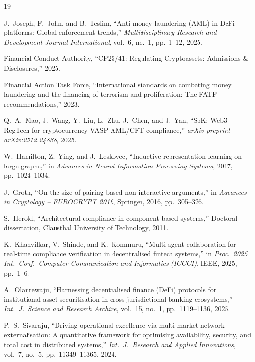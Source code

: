 \documentclass[journal]{IEEEtran}
\begin{document}
\begin{thebibliography}{19}

J.~Joseph, F.~John, and B.~Teslim, ``Anti-money laundering (AML) in DeFi platforms: Global enforcement trends,'' \textit{Multidisciplinary Research and Development Journal International}, vol.~6, no.~1, pp.~1--12, 2025.

Financial Conduct Authority, ``CP25/41: Regulating Cryptoassets: Admissions \& Disclosures,'' 2025.

Financial Action Task Force, ``International standards on combating money laundering and the financing of terrorism and proliferation: The FATF recommendations,'' 2023.

Q.~A.~Mao, J.~Wang, Y.~Liu, L.~Zhu, J.~Chen, and J.~Yan, ``SoK: Web3 RegTech for cryptocurrency VASP AML/CFT compliance,'' \textit{arXiv preprint arXiv:2512.24888}, 2025.

W.~Hamilton, Z.~Ying, and J.~Leskovec, ``Inductive representation learning on large graphs,'' in \textit{Advances in Neural Information Processing Systems}, 2017, pp.~1024--1034.

J.~Groth, ``On the size of pairing-based non-interactive arguments,'' in \textit{Advances in Cryptology -- EUROCRYPT 2016}, Springer, 2016, pp.~305--326.

S.~Herold, ``Architectural compliance in component-based systems,'' Doctoral dissertation, Clausthal University of Technology, 2011.

K.~Khanvilkar, V.~Shinde, and K.~Kommuru, ``Multi-agent collaboration for real-time compliance verification in decentralised fintech systems,'' in \textit{Proc.\ 2025 Int.\ Conf.\ Computer Communication and Informatics (ICCCI)}, IEEE, 2025, pp.~1--6.

A.~Olanrewaju, ``Harnessing decentralised finance (DeFi) protocols for institutional asset securitisation in cross-jurisdictional banking ecosystems,'' \textit{Int.\ J.\ Science and Research Archive}, vol.~15, no.~1, pp.~1119--1136, 2025.

P.~S.~Sivaraju, ``Driving operational excellence via multi-market network externalisation: A quantitative framework for optimising availability, security, and total cost in distributed systems,'' \textit{Int.\ J.\ Research and Applied Innovations}, vol.~7, no.~5, pp.~11349--11365, 2024.


\end{thebibliography}
\end{document}
